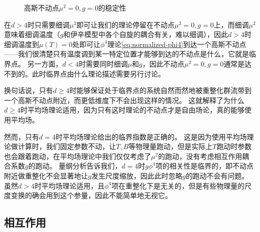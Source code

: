 \documentclass[hyperref, UTF8, a4paper]{ctexart}
\begin{document}
\begin{figure}
    \centering
    \caption{高斯不动点$\mu^2=0, g=0$的稳定性}
    \label{fig:gaussian-stable}
\end{figure}

在$d>4$时只需要细调$\mu^2$即可让我们的理论停留在不动点$\mu^2=0, g=0$上，而细调$\mu^2$意味着细调温度（$g$和伊辛模型中各个自旋的耦合有关，难以细调），因此$d>4$时细调温度到$\mu(T)=0$处即可让$\phi^4$理论\eqref{eq:normalized-phi4}到达一个高斯不动点——我们很清楚只有温度调到某一特定位置才能够到达的不动点是什么，它就是临界点。
另一方面，$d<4$时需要同时细调$\mu$和$g$，因此不动点$\mu^2=0, g=0$通常是达不到的。此时临界点由什么理论描述需要另行讨论。

换句话说，只有$d \geq 4$时能够保证处于临界点的系统自然而然地被重整化群流带到一个高斯不动点附近，而更低维度下不会出现这样的情况。
这就解释了为什么$d \geq 4$时平均场理论适用，因为只有这时理论的不动点才是自由场论，真的能够使用平均场。

然而，只有$d=4$时平均场理论给出的临界指数是正确的。
这是因为使用平均场理论做计算时，我们固定参数不动，让$T, B$等物理量跑动，但是实际上$T$跑动时参数也会跟着跑动，在平均场理论中我们仅仅考虑了$\mu^2$的跑动，没有考虑相互作用耦合系数$g$的跑动。
量纲分析告诉我们，$d=4$时$g\phi^4$项的相关性是临界的，即不动点附近做重整化不会显著地让$g$发生尺度缩放，因此此时忽略$g$的跑动不会有问题。
虽然$d>4$时平均场理论适用，且$\phi^4$项在重整化下是无关的，但是有些物理量的尺度变换的确会用到这个参量，因此不能简单地无视它。

\subsection{相互作用}
\end{document}
